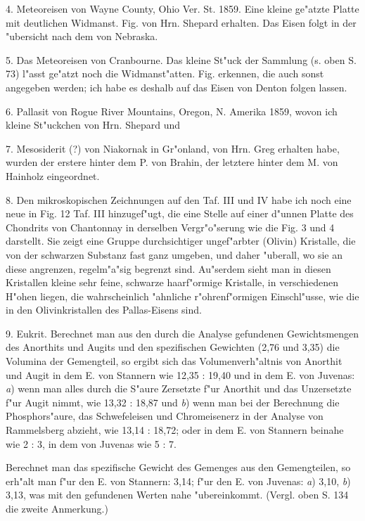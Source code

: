 \documentclass[a4paper, 11pt, oneside]{article}
\begin{document}
4. Meteoreisen von Wayne County, Ohio Ver. St. 1859. Eine kleine ge"atzte Platte mit deutlichen Widmanst. Fig. von Hrn. Shepard erhalten. Das Eisen folgt in der "ubersicht nach dem von Nebraska.

5. Das Meteoreisen von Cranbourne. Das kleine St"uck der Sammlung (s. oben S. 73) l"asst ge"atzt noch die Widmanst"atten. Fig. erkennen, die auch sonst angegeben werden; ich habe es deshalb auf das Eisen von Denton folgen lassen.

6. Pallasit von Rogue River Mountains, Oregon, N. Amerika 1859, wovon ich kleine St"uckchen von Hrn. Shepard und

7. Mesosiderit (?) von Niakornak in Gr"onland, von Hrn. Greg erhalten habe, wurden der erstere hinter dem P. von Brahin, der letztere hinter dem M. von Hainholz eingeordnet.

8. Den mikroskopischen Zeichnungen auf den Taf. III und IV habe ich noch eine neue in Fig. 12 Taf. III hinzugef"ugt, die eine Stelle auf einer d"unnen Platte des Chondrits von Chantonnay in derselben Vergr"o"serung wie die Fig. 3 und 4 darstellt. Sie zeigt eine Gruppe durchsichtiger ungef"arbter (Olivin) Kristalle, die von der schwarzen Substanz fast ganz umgeben, und daher "uberall, wo sie an diese angrenzen, regelm"a"sig begrenzt sind. Au"serdem sieht man in diesen Kristallen kleine sehr feine, schwarze haarf"ormige Kristalle, in verschiedenen H"ohen liegen, die wahrscheinlich "ahnliche r"ohrenf"ormigen Einschl"usse, wie die in den Olivinkristallen des Pallas-Eisens sind.

9. Eukrit. Berechnet man aus den durch die Analyse gefundenen Gewichtsmengen des Anorthits und Augits und den spezifischen Gewichten (2,76 und 3,35) die Volumina der Gemengteil, so ergibt sich das Volumenverh"altnis von Anorthit und Augit in dem E. von Stannern wie 12,35 : 19,40 und in dem E. von Juvenas: \emph{a}) wenn man alles durch die S"aure Zersetzte f"ur Anorthit und das Unzersetzte f"ur Augit nimmt, wie 13,32 : 18,87 und \emph{b}) wenn man bei der Berechnung die Phosphors"aure, das Schwefeleisen und Chromeisenerz in der Analyse von Rammelsberg abzieht, wie 13,14 : 18,72; oder in dem E. von Stannern beinahe wie 2 : 3, in dem von Juvenas wie 5 : 7.

Berechnet man das spezifische Gewicht des Gemenges aus den Gemengteilen, so erh"alt man f"ur den E. von Stannern: 3,14; f"ur den E. von Juvenas: \emph{a}) 3,10, \emph{b}) 3,13, was mit den gefundenen Werten nahe "ubereinkommt. (Vergl. oben S. 134 die zweite Anmerkung.)
\end{document}
